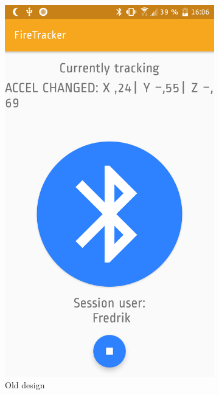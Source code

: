 \documentclass[../Main/thesis.tex]{subfiles}
\begin{document}
\begin{figure}[h]
\begin{subfigure}{0.23\textwidth}
		\includegraphics[width=\textwidth]{../fig/firetracker_app_old_3_noframe}
		\caption{Old design}
		\label{fig:app-old-design-tracking-iteration3}
	\end{subfigure}
	\begin{subfigure}{0.23\textwidth}

\end{subfigure}
\end{figure}
\end{document}
